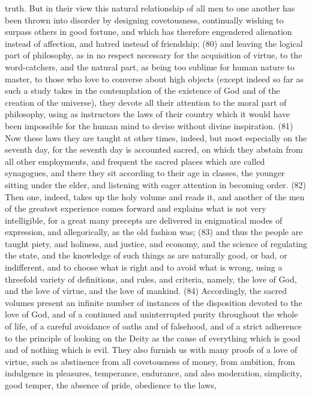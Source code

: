 truth. But in their view this natural relationship of all men to one another has been thrown into
disorder by designing covetousness, continually wishing to surpass others in good fortune, and
which has therefore engendered alienation instead of affection, and hatred instead of friendship;
(80) and leaving the logical part of philosophy, as in no respect necessary for the acquisition of
virtue, to the word-catchers, and the natural part, as being too sublime for human nature to master,
to those who love to converse about high objects (except indeed so far as such a study takes in
the contemplation of the existence of God and of the creation of the universe), they devote all their
attention to the moral part of philosophy, using as instructors the laws of their country which it
would have been impossible for the human mind to devise without divine inspiration. (81) Now
these laws they are taught at other times, indeed, but most especially on the seventh day, for the
seventh day is accounted sacred, on which they abstain from all other employments, and frequent
the sacred places which are called synagogues, and there they sit according to their age in
classes, the younger sitting under the elder, and listening with eager attention in becoming order.
(82) Then one, indeed, takes up the holy volume and reads it, and another of the men of the
greatest experience comes forward and explains what is not very intelligible, for a great many
precepts are delivered in enigmatical modes of expression, and allegorically, as the old fashion
was; (83) and thus the people are taught piety, and holiness, and justice, and economy, and the
science of regulating the state, and the knowledge of such things as are naturally good, or bad, or
indifferent, and to choose what is right and to avoid what is wrong, using a threefold variety of
definitions, and rules, and criteria, namely, the love of God, and the love of virtue, and the love of
mankind. (84) Accordingly, the sacred volumes present an infinite number of instances of the
disposition devoted to the love of God, and of a continued and uninterrupted purity throughout the
whole of life, of a careful avoidance of oaths and of falsehood, and of a strict adherence to the
principle of looking on the Deity as the cause of everything which is good and of nothing which is
evil. They also furnish us with many proofs of a love of virtue, such as abstinence from all
covetousness of money, from ambition, from indulgence in pleasures, temperance, endurance,
and also moderation, simplicity, good temper, the absence of pride, obedience to the laws,
